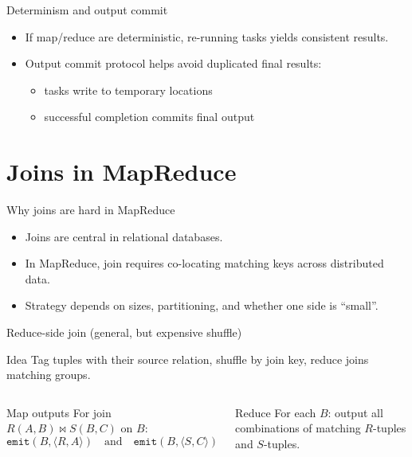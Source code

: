 \documentclass[10pt,aspectratio=169]{beamer}
\newenvironment{examplebox}[1][Example]{\begin{exampleblock}{#1}}{\end{exampleblock}}
\begin{document}
\begin{frame}{Determinism and output commit}
\begin{itemize}
  \item If map/reduce are deterministic, re-running tasks yields consistent results.
  \item Output commit protocol helps avoid duplicated final results:
  \begin{itemize}
    \item tasks write to temporary locations
    \item successful completion commits final output
  \end{itemize}
\end{itemize}
\end{frame}

\section{Joins in MapReduce}

\begin{frame}{Why joins are hard in MapReduce}
\begin{itemize}
  \item Joins are central in relational databases.
  \item In MapReduce, join requires co-locating matching keys across distributed data.
  \item Strategy depends on sizes, partitioning, and whether one side is “small”.
\end{itemize}
\end{frame}

\begin{frame}{Reduce-side join (general, but expensive shuffle)}
\begin{block}{Idea}
Tag tuples with their source relation, shuffle by join key, reduce joins matching groups.
\end{block}

\begin{columns}[T,onlytextwidth]
\begin{examplebox}[Map outputs]
For join \(R(A,B)\Join S(B,C)\) on \(B\):
\[
\texttt{emit}(B,\langle R,A\rangle)\quad\text{and}\quad \texttt{emit}(B,\langle S,C\rangle)
\]
\end{examplebox}
\begin{examplebox}[Reduce]
For each \(B\): output all combinations of matching \(R\)-tuples and \(S\)-tuples.
\end{examplebox}

\centering
{}
\end{columns}
\end{frame}
\end{document}
